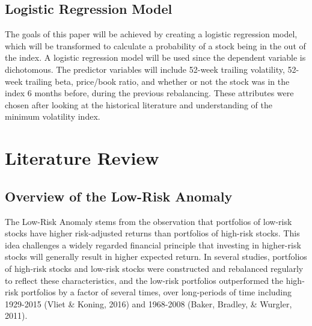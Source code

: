 \documentclass[12pt,twoside]{reedthesis}
\theoremstyle{definition}
\theoremstyle{definition}
\theoremstyle{definition}
\theoremstyle{remark}
\begin{document}
\subsection{Logistic Regression Model}\label{logistic-regression-model}

The goals of this paper will be achieved by creating a logistic
regression model, which will be transformed to calculate a probability
of a stock being in the out of the index. A logistic regression model
will be used since the dependent variable is dichotomous. The predictor
variables will include 52-week trailing volatility, 52-week trailing
beta, price/book ratio, and whether or not the stock was in the index 6
months before, during the previous rebalancing. These attributes were
chosen after looking at the historical literature and understanding of
the minimum volatility index.

\section{Literature Review}\label{literature-review}

\subsection{Overview of the Low-Risk
Anomaly}\label{overview-of-the-low-risk-anomaly}

The Low-Risk Anomaly stems from the observation that portfolios of
low-risk stocks have higher risk-adjusted returns than portfolios of
high-risk stocks. This idea challenges a widely regarded financial
principle that investing in higher-risk stocks will generally result in
higher expected return. In several studies, portfolios of high-risk
stocks and low-risk stocks were constructed and rebalanced regularly to
reflect these characteristics, and the low-risk portfolios outperformed
the high-risk portfolios by a factor of several times, over long-periods
of time including 1929-2015 (Vliet \& Koning, 2016) and 1968-2008
(Baker, Bradley, \& Wurgler, 2011).
\end{document}
